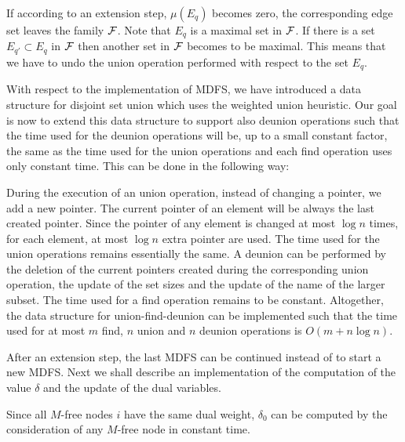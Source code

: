 \documentclass[12pt,twoside,a4paper]{article}
\begin{document}
If according to an extension step, $\mu(E_q)$ becomes zero, the corresponding edge
set leaves the family $\cal F$. Note that $E_q$ is a maximal set in $\cal F$. 
If there is a set $E_{q'} \subset E_q$ in $\cal F$ then another set in $\cal F$ becomes 
to be maximal. This means that we have to undo the union operation performed with respect 
to the set $E_q$. 

With respect to the implementation of MDFS, we have introduced a data structure for
disjoint set union which uses the weighted union heuristic. Our goal is now to extend
this data structure to support also deunion operations such that the time used for the 
deunion operations will be, up to
a small constant factor, the same as the time used for the union operations and each 
find operation uses only constant time. This can be done in the following way:

During the execution of an union operation, instead of changing a pointer, we add a
new pointer. The current pointer of an element will be always the last created pointer.
Since the pointer of any element is changed at most $\log n$ times, for each element, 
at most $\log n$ extra pointer are used. The time used for the union operations
remains essentially the same. A deunion can be performed by the deletion of the current 
pointers created during the corresponding union operation, the update of the set sizes 
and the update of the name of the larger subset. The time used for a find operation
remains to be constant. Altogether, the data structure for 
union-find-deunion can be implemented such that the time used for at most $m$ find,
$n$ union and $n$ deunion operations is $O(m + n \log n)$.

After an extension step, the last MDFS can be continued instead of
to start a new MDFS. 
Next we shall describe an implementation of the computation of the value $\delta$ and
the update of the dual variables.

\medskip
Since all $M$-free nodes $i$ have the same dual weight, $\delta_0$
can be computed by the consideration of any $M$-free node in constant time.
\end{document}
